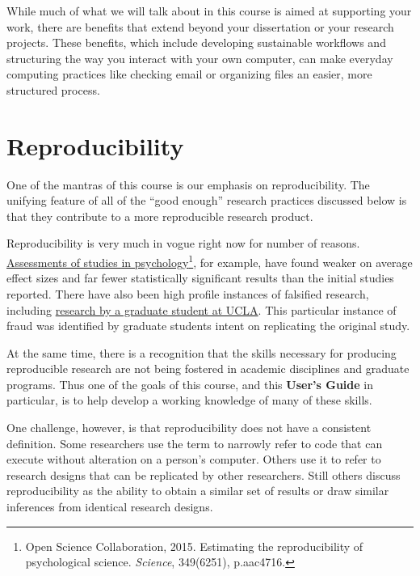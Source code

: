 \documentclass[]{book}
\let\rmarkdownfootnote\footnote%
\def\footnote{\protect\rmarkdownfootnote}
\theoremstyle{definition}
\theoremstyle{definition}
\theoremstyle{definition}
\theoremstyle{remark}
\begin{document}
While much of what we will talk about in this course is aimed at
supporting your work, there are benefits that extend beyond your
dissertation or your research projects. These benefits, which include
developing sustainable workflows and structuring the way you interact
with your own computer, can make everyday computing practices like
checking email or organizing files an easier, more structured process.

\section{Reproducibility}\label{reproducibility}

One of the mantras of this course is our emphasis on reproducibility.
The unifying feature of all of the ``good enough'' research practices
discussed below is that they contribute to a more reproducible research
product.

Reproducibility is very much in vogue right now for number of reasons.
\href{http://science.sciencemag.org/content/349/6251/aac4716}{Assessments
of studies in psychology}\footnote{Open Science Collaboration, 2015.
  Estimating the reproducibility of psychological science.
  \emph{Science}, 349(6251), p.aac4716.}, for example, have found weaker
on average effect sizes and far fewer statistically significant results
than the initial studies reported. There have also been high profile
instances of falsified research, including
\href{http://nymag.com/scienceofus/2015/05/how-a-grad-student-uncovered-a-huge-fraud.html}{research
by a graduate student at UCLA}. This particular instance of fraud was
identified by graduate students intent on replicating the original
study.

At the same time, there is a recognition that the skills necessary for
producing reproducible research are not being fostered in academic
disciplines and graduate programs. Thus one of the goals of this course,
and this \textbf{User's Guide} in particular, is to help develop a
working knowledge of many of these skills.

One challenge, however, is that reproducibility does not have a
consistent definition. Some researchers use the term to narrowly refer
to code that can execute without alteration on a person's computer.
Others use it to refer to research designs that can be replicated by
other researchers. Still others discuss reproducibility as the ability
to obtain a similar set of results or draw similar inferences from
identical research designs.
\end{document}
